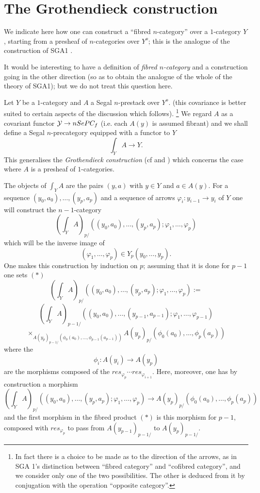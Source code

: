 
\clearpage
\section{The Grothendieck construction}
\label{gropage}

We indicate here how one can construct a ``fibred $n$-category'' over a
$1$-category $Y$, starting from a presheaf of $n$-categories over $Y^o$; this
is the analogue of the construction of SGA1 \cite{SGA1}.

It would be interesting to have a definition of
{\em fibred $n$-category} and a construction going in the other direction (so
as to obtain the analogue of the whole of the theory of SGA1); but we do not
treat this question here.

Let $Y$ be a $1$-category and $A$ a Segal $n$-prestack over $Y^o$. (this
covariance is better suited to certain aspects of the discussion which
follows).
\footnote{In fact there is a choice to be made as to the direction of the
arrows, as in SGA 1's distinction between ``fibred category'' and
``cofibred category'', and we consider only one of the two possibilities.
The other is deduced from it by conjugation with the operation ``opposite
category''.}
We regard $A$ as a covariant functor ${\cal Y}
\rightarrow nSePC_f$ (i.e. each $A(y)$ is assumed fibrant) and we shall
define a Segal $n$-precategory equipped with a functor to $Y$
$$
\int _YA \rightarrow Y.
$$
This generalises the {\em
Grothendieck construction} (cf \cite{ThomasonLimits} and \cite{DwyerKan2}) which
concerns the case where $A$ is a presheaf of $1$-categories.

The objects of $\int _YA$ are the pairs $(y,a)$ with $y\in Y$ and
$a\in A(y)$. For a sequence $(y_0,a_0),\ldots , (y_p,a_p)$
and a sequence of arrows $\varphi _i : y_{i-1}\rightarrow y_i$ of $Y$ one
will construct the $n-1$-category
$$
(\int _YA)_{p/}((y_0,a_0),\ldots , (y_p,a_p); \varphi _1,\ldots , \varphi _p)
$$
which will be the inverse image of
$$
(\varphi _1,\ldots , \varphi _p)\in Y_{p}(y_0,\ldots , y_p).
$$
One makes this construction by induction on $p$; assuming that it is done
for $p-1$ one sets $(\ast )$
$$
(\int _YA)_{p/}((y_0,a_0),\ldots , (y_p,a_p); \varphi _1,\ldots , \varphi _p)
:=
$$
$$
(\int _YA)_{p-1/}((y_0,a_0),\ldots , (y_{p-1},a_{p-1});
\varphi _1,\ldots , \varphi
_{p-1})
$$
$$
\times _{A(y_{p})_{p-1/}(\phi _0(a_0), \ldots , \phi _{p-1}(a_{p-1}))}
A(y_{p})_{p/}(\phi _0(a_0), \ldots , \phi _{p}(a_{p}))
$$
where the
$$
\phi _i : A(y_i)\rightarrow A(y_p)
$$
are the morphisms composed of the $res_{\varphi _p}\cdots res _{\varphi
_{i+1}}$. Here, moreover, one has by construction a morphism
$$
(\int _YA)_{p/}((y_0,a_0),\ldots , (y_p,a_p); \varphi _1,\ldots , \varphi _p)
\rightarrow
A(y_{p})_{p/}(\phi _0(a_0), \ldots , \phi _{p}(a_{p}))
$$
and the first morphism in the fibred product $(\ast )$ is this morphism for
$p-1$, composed with $res_{\varphi _p}$ to pass from $A(y_{p-1})_{p-1/}$ to
$A(y_p)_{p-1/}$.

